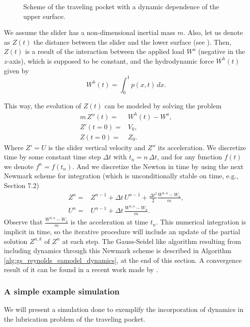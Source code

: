 \begin{figure}[ht!]
 \centering 
 \def\svgwidth{\textwidth}	

\caption[Scheme of the rectangular wedges problem]{Scheme of the traveling pocket with  a dynamic dependence of the upper surface.}\label{fig:pocket_dynamics}
\end{figure}

We assume the slider has a non-dimensional inertial mass $m$. Also, let us denote as $Z(t)$ the distance between the slider and the lower surface (see ). Then, $Z(t)$ is a result of the interaction between the applied load $W^a$ (negative in the $z$-axis), which is supposed to be constant, and the hydrodynamic force $W^h(t)$ given by 
\begin{equation}
W^h(t) = \int_0^1 p(x,t)\,dx\label{eq:wa_pocket}.
\end{equation}

This way, the evolution of $Z(t)$ can be modeled by solving the problem
\begin{align}
m\,Z''(t) ={}& W^h(t)-W^a,\label{eq:newton_slider}\\
Z'(t=0)={}&V_0,\\
Z(t=0)={}&Z_0.
\end{align}
Where $Z'=U$ is the slider vertical velocity and $Z''$ its acceleration. We discretize time by some constant time step $\Delta t$ with $t_n=n\,\Delta t$, and for any function $f(t)$ we denote $f^n=f(t_n)$. And we discretize the Newton  in time by using the next Newmark scheme for integration (which is unconditionally stable on time, e.g., \cite{geradin2015} Section 7.2) 
\begin{align}
Z^n ={}& Z^{n-1}+\Delta t\, U^{n-1} + \frac{\Delta t^2}{2}\frac{W^{h,n}-W_a}{m},\\
U^n = {}& U^{n-1} + \Delta t\, \frac{W^{h,n}-W_a}{m}.
\end{align}
Observe that $\frac{W^{h,n}-W_a}{m}$ is the acceleration at time $t_n$. This numerical integration is implicit in time, so the iterative procedure will include an update of the partial solution $Z^{n,k}$ of $Z^{n}$ at each step. The Gauss-Seidel like algorithm resulting from including dynamics through this Newmark scheme is described in Algorithm \ref{alg:gs_reynolds_eamodel_dynamics}, at the end of this section. A convergence result of it can be found in a recent work made by \citeauthor{buscaglia2014i} \cite{buscaglia2014i}.

\subsubsection*{A simple example simulation}
We will present a simulation done to exemplify the incorporation of dynamics in the lubrication problem of the traveling pocket.

